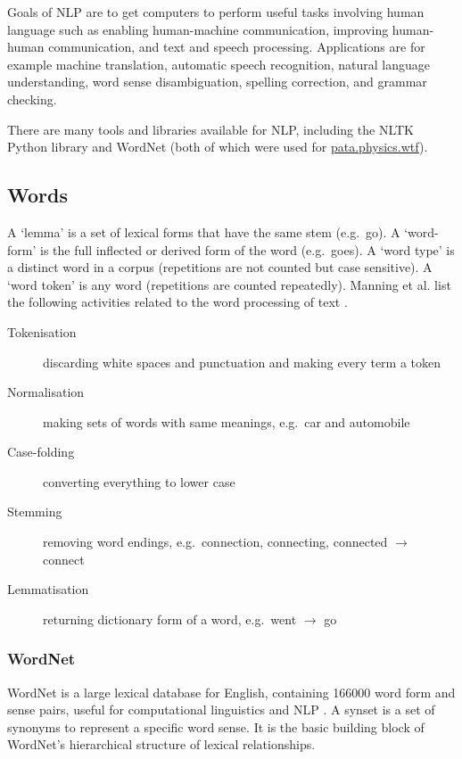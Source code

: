 Goals of \ac{NLP} are to get computers to perform useful tasks involving human language such as enabling human-machine communication, improving human-human communication, and text and speech processing. Applications are for example machine translation, automatic speech recognition, natural language understanding, word sense disambiguation, spelling correction, and grammar checking.

There are many tools and libraries available for \ac{NLP}, including the \ac{NLTK} Python library \autocite{Bird2009, NLTK2016} and WordNet \autocite{Princeton2010} (both of which were used for \url{pata.physics.wtf}).


\subsection{Words}

A `lemma' is a set of lexical forms that have the same stem (e.g.\ go). A `word-form' is the full inflected or derived form of the word (e.g.\ goes). A `word type' is a distinct word in a corpus (repetitions are not counted but case sensitive). A `word token' is any word (repetitions are counted repeatedly). Manning et al. list the following activities related to the word processing of text \autocite*{Manning2009}.

\begin{description}
  \item [Tokenisation] discarding white spaces and punctuation and making every term a token
  \item [Normalisation] making sets of words with same meanings, e.g.\ car and automobile
  \item [Case-folding] converting everything to lower case
  \item [Stemming] removing word endings, e.g.\ connection, connecting, connected $\to$ connect
  \item [Lemmatisation] returning dictionary form of a word, e.g.\ went $\to$ go
\end{description}


\subsubsection{WordNet}
\label{s:wordnet}

WordNet is a large lexical database for English, containing \num{166000} word form and sense pairs, useful for computational linguistics and \ac{NLP} \autocite{Miller1995}. A synset is a set of synonyms to represent a specific word sense. It is the basic building block of WordNet's hierarchical structure of lexical relationships.

